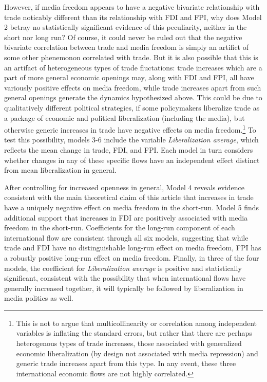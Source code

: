 \documentclass[a4paper]{article}\usepackage[]{graphicx}\usepackage[]{color}
\begin{document}
However, if media freedom appears to have a negative bivariate relationship with trade noticably different than its relationship with FDI and FPI, why does Model 2 betray no statistically significant evidence of this peculiarity, neither in the short nor long run? Of course, it could never be ruled out that the negative bivariate correlation between trade and media freedom is simply an artifict of some other phenemonon correlated with trade. But it is also possible that this is an artifact of heterogeneous types of trade fluctations: trade increases which are a part of more general economic openings may, along with FDI and FPI, all have variously positive effects on media freedom, while trade increases apart from such general openings generate the dynamics hypothesized above. This could be due to qualitatively different political strategies, if some policymakers liberalize trade as a package of economic and political liberalization (including the media), but otherwise generic increases in trade have negative effects on media freedom.\footnote{This is not to argue that multicollinearity or correlation among independent variables is inflating the standard errors, but rather that there are perhaps heterogenous types of trade increases, those associated with generalized economic liberalization (by design not associated with media repression) and generic trade increases apart from this type. In any event, these three international economic flows are not highly correlated.} To test this possibility, models 3-6 include the variable \emph{Liberalization average}, which reflects the mean change in trade, FDI, and FPI. Each model in turn considers whether changes in any of these specific flows have an independent effect distinct from mean liberalization in general.

After controlling for increased openness in general, Model 4 reveals evidence consistent with the main theoretical claim of this article that increases in trade have a uniquely negative effect on media freedom in the short-run. Model 5 finds additional support that increases in FDI are positively associated with media freedom in the short-run. Coefficients for the long-run component of each international flow are consistent through all six models, suggesting that while trade and FDI have no distinguishable long-run effect on media freedom, FPI has a robustly positive long-run effect on media freedom. Finally, in three of the four models, the coefficient for \emph{Liberalization average} is positive and statistically significant, consistent with the possibility that when international flows have generally increased together, it will typically be followed by liberalization in media politics as well.
\end{document}
